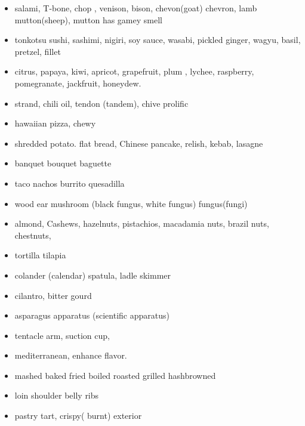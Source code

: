 \documentclass[a4paper,11pt,twoside]{book}
\begin{document}
\begin{itemize}
	\item salami, T-bone, chop , venison, bison, chevon(goat) chevron, lamb mutton(sheep), mutton has gamey smell
	
	\item tonkotsu sushi, sashimi, nigiri, soy sauce, wasabi, pickled ginger, wagyu, basil, pretzel, fillet
	
	\item citrus, papaya, kiwi, apricot, grapefruit, plum , lychee, raspberry, pomegranate,  jackfruit, honeydew.  
	
	\item strand, chili oil, tendon (tandem), chive prolific 
	
	\item hawaiian pizza, chewy
	
	\item shredded potato. flat bread, Chinese pancake, relish, kebab, lasagne 
	
	\item banquet bouquet baguette
	
	\item taco nachos burrito quesadilla
	
	\item wood ear mushroom (black fungus, white fungus) fungus(fungi)
	
	\item almond, Cashews, hazelnuts, pistachios,  macadamia nuts, brazil nuts, chestnuts, 
	
	\item tortilla tilapia 
	
	\item colander (calendar) spatula, ladle skimmer
	
	\item cilantro, bitter gourd 
	
	\item asparagus apparatus (scientific apparatus)
	
	\item tentacle arm, suction cup,
	
	\item mediterranean, enhance flavor. 
	
	\item mashed baked fried boiled roasted grilled hashbrowned 
	
	\item loin shoulder belly ribs
	
	\item pastry tart, crispy( burnt) exterior
	

\end{itemize}
\end{document}
